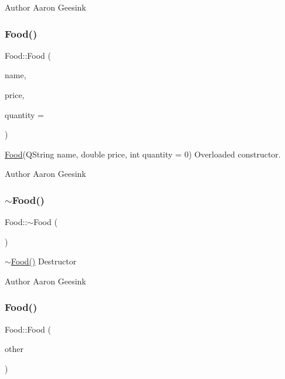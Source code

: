\begin{DoxyAuthor}{Author}
Aaron Geesink 
\end{DoxyAuthor}
\mbox{\label{class_food_aa479389d71859831d48d21bae7fa5217}} 
\subsubsection{\texorpdfstring{Food()}{Food()}\hspace{0.1cm}{\footnotesize\ttfamily [2/4]}}
{\footnotesize\ttfamily Food\+::\+Food (\begin{DoxyParamCaption}\item[{Q\+String}]{name,  }\item[{double}]{price,  }\item[{int}]{quantity = {} }\end{DoxyParamCaption})}



\mbox{\hyperlink{class_food}{Food}}(Q\+String name, double price, int quantity = 0) Overloaded constructor. 

\begin{DoxyAuthor}{Author}
Aaron Geesink 
\end{DoxyAuthor}
\mbox{\label{class_food_a6f25dffd1fb347c982a53b9a384c611a}} 
\subsubsection{\texorpdfstring{$\sim$Food()}{~Food()}}
{\footnotesize\ttfamily Food\+::$\sim$\+Food (\begin{DoxyParamCaption}{ }\end{DoxyParamCaption})}



\mbox{\hyperlink{class_food_a6f25dffd1fb347c982a53b9a384c611a}{$\sim$\+Food()}} Destructor 

\begin{DoxyAuthor}{Author}
Aaron Geesink 
\end{DoxyAuthor}
\mbox{\label{class_food_a365c2d6175447d0fe29e57facc277570}} 
\subsubsection{\texorpdfstring{Food()}{Food()}\hspace{0.1cm}{\footnotesize\ttfamily [3/4]}}
{\footnotesize\ttfamily Food\+::\+Food (\begin{DoxyParamCaption}\item[{const \mbox{\hyperlink{class_food}{Food}} \&}]{other }\end{DoxyParamCaption})}



